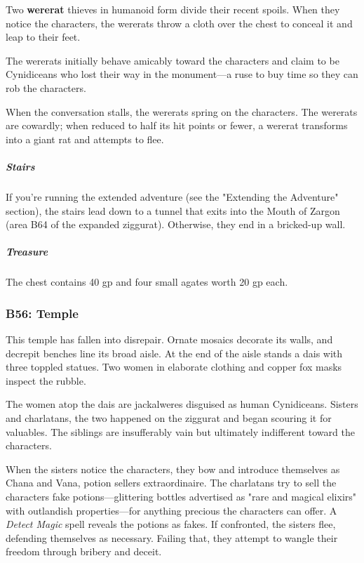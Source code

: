\documentclass[10pt,a4paper,twoside,bg=print,twocolumn,openany,nodeprecatedcode]{dndbook}
\begin{document}
Two \textbf{wererat} thieves in humanoid form divide their recent spoils. When they notice the characters, the wererats throw a cloth over the chest to conceal it and leap to their feet.

The wererats initially behave amicably toward the characters and claim to be Cynidiceans who lost their way in the monument—a ruse to buy time so they can rob the characters.

When the conversation stalls, the wererats spring on the characters. The wererats are cowardly; when reduced to half its hit points or fewer, a wererat transforms into a giant rat and attempts to flee.

\subparagraph{Stairs}
If you're running the extended adventure (see the "Extending the Adventure" section), the stairs lead down to a tunnel that exits into the Mouth of Zargon (area B64 of the expanded ziggurat). Otherwise, they end in a bricked-up wall.

\subparagraph{Treasure}
The chest contains 40 gp and four small agates worth 20 gp each.

\subsubsection{B56: Temple}
\begin{DndReadAloud}{}
This temple has fallen into disrepair. Ornate mosaics decorate its walls, and decrepit benches line its broad aisle. At the end of the aisle stands a dais with three toppled statues. Two women in elaborate clothing and copper fox masks inspect the rubble.

\end{DndReadAloud}

The women atop the dais are jackalweres disguised as human Cynidiceans. Sisters and charlatans, the two happened on the ziggurat and began scouring it for valuables. The siblings are insufferably vain but ultimately indifferent toward the characters.

When the sisters notice the characters, they bow and introduce themselves as Chana and Vana, potion sellers extraordinaire. The charlatans try to sell the characters fake potions—glittering bottles advertised as "rare and magical elixirs" with outlandish properties—for anything precious the characters can offer. A \textit{Detect Magic} spell reveals the potions as fakes. If confronted, the sisters flee, defending themselves as necessary. Failing that, they attempt to wangle their freedom through bribery and deceit.
\end{document}
